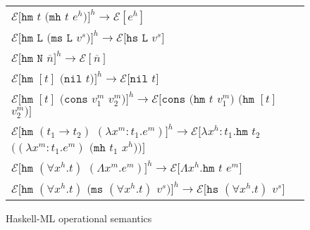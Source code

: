 \begin{figure}[p]
\centering
\begin{tabular}{l}


$\mathscr{E}[\mathtt{hm}$ $t$ $(\mathtt{mh}$ $t$ $e^h)]^h\rightarrow\mathscr{E}[e^h]$ \\


$\mathscr{E}[\mathtt{hm}$ $\mathtt{L}$ $(\mathtt{ms}$ $\mathtt{L}$ $v^s)]^h\rightarrow\mathscr{E}[\mathtt{hs}$ $\mathtt{L}$ $v^s]$ \\


$\mathscr{E}[\mathtt{hm}$ $\mathtt{N}$ $\overline{n}]^h\rightarrow\mathscr{E}[\overline{n}]$ \\


$\mathscr{E}[\mathtt{hm}$ $[t]$ $(\mathtt{nil}$ $t)]^h\rightarrow\mathscr{E}[\mathtt{nil}$ $t]$ \\


$\mathscr{E}[\mathtt{hm}$ $[t]$ $(\mathtt{cons}$ $v^m_1$ $v^m_2)]^h\rightarrow\mathscr{E}[\mathtt{cons}$ $(\mathtt{hm}$ $t$ $v^m_1)$ $(\mathtt{hm}$ $[t]$ $v^m_2)]$ \\


$\mathscr{E}[\mathtt{hm}$ $(t_1\rightarrow t_2)$ $(\lambda x^m:t_1.e^m)]^h\rightarrow\mathscr{E}[\lambda x^h:t_1.\mathtt{hm}$ $t_2$ $((\lambda x^m:t_1.e^m)$ $(\mathtt{mh}$ $t_1$ $x^h))]$ \\


$\mathscr{E}[\mathtt{hm}$ $(\forall x^h.t)$ $(\Lambda x^m.e^m)]^h\rightarrow\mathscr{E}[\Lambda x^h.\mathtt{hm}$ $t$ $e^m]$ \\


$\mathscr{E}[\mathtt{hm}$ $(\forall x^h.t)$ $(\mathtt{ms}$ $(\forall x^h.t)$ $v^s)]^h\rightarrow\mathscr{E}[\mathtt{hs}$ $(\forall x^h.t)$ $v^s]$ \\

\end{tabular}
\caption{Haskell-ML operational semantics}
\label{hmos}
\end{figure}